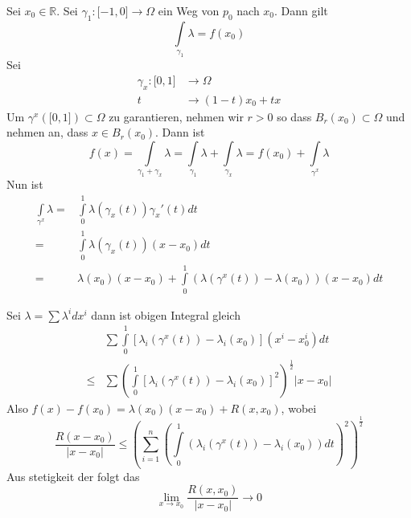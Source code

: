 \noindent Sei $x_0\in\mathbb{R}$. Sei $\gamma_1:\lbrack -1,0\rbrack\rightarrow\Omega$ ein Weg von $p_0$ nach $x_0$. Dann gilt \[\int\limits_{{\gamma _1}} \lambda   = f\left( {{x_0}} \right)\]
Sei
\begin{align*}
\gamma_x:\lbrack 0,1\rbrack &\rightarrow\Omega\\
t &\rightarrow (1-t)x_0+tx
\end{align*}
Um $\gamma^x\left( \lbrack 0,1\rbrack\right)\subset\Omega$ zu garantieren, nehmen wir $r>0$ so dass $B_r\left( x_0\right)\subset\Omega$ und nehmen an, dass $x\in B_r\left( x_0\right)$. Dann ist
\[f(x) = \int\limits_{{\gamma _1} + {\gamma _x}} \lambda   = \int\limits_{{\gamma _1}} \lambda   + \int\limits_{{\gamma _x}} \lambda   = f\left( {{x_0}} \right) + \int\limits_{{\gamma ^x}} \lambda  \]
Nun ist
\begin{align*}
\int\limits_{{\gamma ^x}} \lambda   = &\int\limits_0^1 {\lambda \left( {{\gamma _x}\left( t \right)} \right){\gamma _x}'\left( t \right)} dt\\
 = &\int\limits_0^1 {\lambda \left( {{\gamma _x}\left( t \right)} \right)\left( {x - {x_0}} \right)} dt\\
 = &\lambda \left( {{x_0}} \right)\left( {x - {x_0}} \right) + \int\limits_0^1 {\left( {\lambda \left( {{\gamma ^x}\left( t \right)} \right) - \lambda \left( {{x_0}} \right)} \right)\left( {x - {x_0}} \right)dt} 
\end{align*}

Sei $\lambda  = \sum {{\lambda ^i}d{x^i}} $ dann ist obigen Integral gleich 
\begin{align*}
&\sum {\int\limits_0^1 {\left[ {{\lambda _i}\left( {{\gamma ^x}\left( t \right)} \right) - {\lambda _i}\left( {{x_0}} \right)} \right]\left( {{x^i} - x_0^i} \right)dt} }\\
 \le &\sum {{{\left( {\int\limits_0^1 {{{\left[ {{\lambda _i}\left( {{\gamma ^x}\left( t \right)} \right) - {\lambda _i}\left( {{x_0}} \right)} \right]}^2}} } \right)}^{\frac{1}{2}}}} \left| {x - {x_0}} \right| 
\end{align*}
Also $f\left( x \right) - f\left( {{x_0}} \right) = \lambda \left( {{x_0}} \right)\left( {x - {x_0}} \right) + R\left( {x,{x_0}} \right)$, wobei 
\[\frac{{R\left( {x - {x_0}} \right)}}{{\left| {x - {x_0}} \right|}} \le {\left( {\sum\limits_{i = 1}^n {{{\left( {\int\limits_0^1 {\left( {{\lambda _i}\left( {{\gamma ^x}\left( t \right)} \right) - {\lambda _i}\left( {{x_0}} \right)} \right)dt} } \right)}^2}} } \right)^{\frac{1}{2}}}\]
Aus stetigkeit der  folgt das
\[\mathop {\lim }\limits_{x \to {x_0}} \frac{{R\left( {x,{x_0}} \right)}}{{\left| {x - {x_0}} \right|}} \to 0\]

